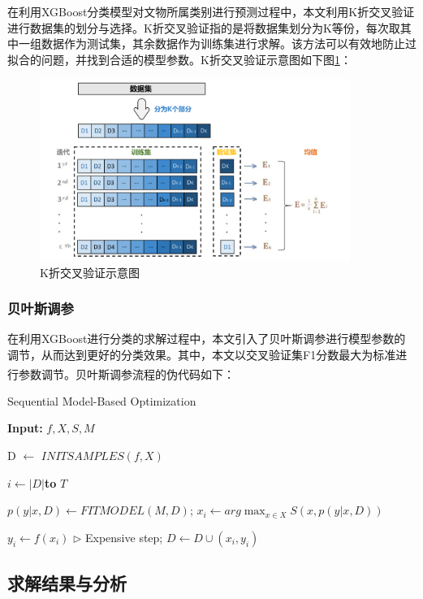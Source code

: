 \documentclass[withoutpreface,bwprint]{cumcmthesis} %
\begin{document}
在利用XGBoost分类模型对文物所属类别进行预测过程中，本文利用K折交叉验证进行数据集的划分与选择。K折交叉验证指的是将数据集划分为K等份，每次取其中一组数据作为测试集，其余数据作为训练集进行求解。该方法可以有效地防止过拟合的问题，并找到合适的模型参数。K折交叉验证示意图如下图\ref{kzhe}：

\begin{figure}[H]
  \centering
  \includegraphics[width=0.9\textwidth]{figure/k折}
  \caption{K折交叉验证示意图}
  \label{kzhe}
\end{figure}

\subsubsection{贝叶斯调参}

在利用XGBoost进行分类的求解过程中，本文引入了贝叶斯调参进行模型参数的调节，从而达到更好的分类效果。其中，本文以交叉验证集F1分数最大为标准进行参数调节。贝叶斯调参流程的伪代码如下\textsuperscript{\cite{ref5}}：

\begin{algorithm}[H]
  \caption{ Sequential Model-Based Optimization}
  \begin{algorithmic}[1]
    \State \textbf{Input:} $f,X,S,M$
    
    \State D $\leftarrow$ $INITSAMPLES(f,X)$
    
    \For $i \leftarrow |D| $\textbf{to} $T$
    
    \State  $p(y|x,D) \leftarrow FITMODEL(M,D)$; $x_i \leftarrow arg \max_{x \in X} S(x,p(y|x,D))$
    
    \State   $y_i \leftarrow f(x_i)$ $\triangleright$ Expensive  step; $D \leftarrow D \cup (x_i,y_i)$
    \EndFor
  \end{algorithmic}
\end{algorithm}

\subsection{求解结果与分析}
\end{document}
